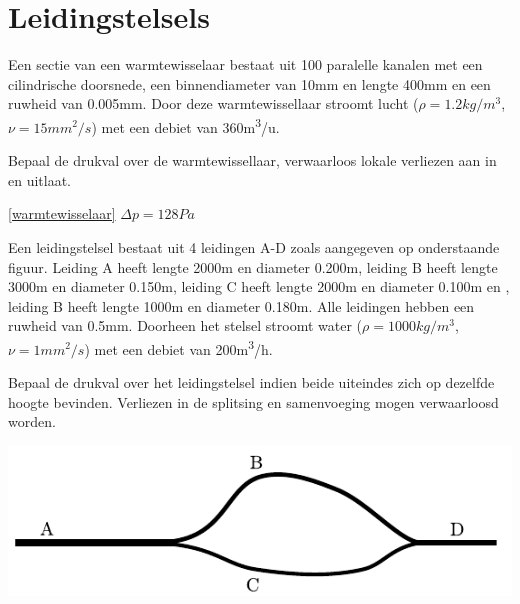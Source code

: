 \chapter{Leidingstelsels}
\label{sec:Leidingstelsels}
\begin{toepassing}[*]
	\label{warmtewisselaar}
Een sectie van een warmtewisselaar bestaat uit 100 paralelle kanalen met een cilindrische doorsnede, een binnendiameter van 10mm en lengte 400mm en een ruwheid van 0.005mm. Door deze warmtewissellaar stroomt lucht ($\rho=1.2\unit{kg/m^3}$, $\nu=15\unit{mm^2/s}$) met een debiet van 360\unit{m^3/u}.
		
Bepaal de drukval over de warmtewissellaar, verwaarloos lokale verliezen aan in en uitlaat.	
\end{toepassing}
\begin{antwoord}{\ref{warmtewisselaar}}
	$\Delta p = 128\unit{Pa}$
\end{antwoord}
\begin{toepassing}[*]
	\label{serie parallel}
Een leidingstelsel bestaat uit 4 leidingen A-D zoals aangegeven op onderstaande figuur. Leiding A heeft lengte 2000m en diameter 0.200m, leiding B heeft lengte 3000m en diameter 0.150m, leiding C heeft lengte 2000m en diameter 0.100m en , leiding B heeft lengte 1000m en diameter 0.180m. Alle leidingen hebben een ruwheid van 0.5mm. Doorheen het stelsel stroomt water ($\rho=1000\unit{kg/m^3}$, $\nu=1\unit{mm^2/s}$) met een debiet van 200\unit{m^3/h}.

Bepaal de drukval over het leidingstelsel indien beide uiteindes zich op dezelfde hoogte bevinden. Verliezen in de splitsing en samenvoeging mogen verwaarloosd worden.

	\centering
	\includegraphics{fig/leidingstelsels/serie_parallel}
\end{toepassing}
